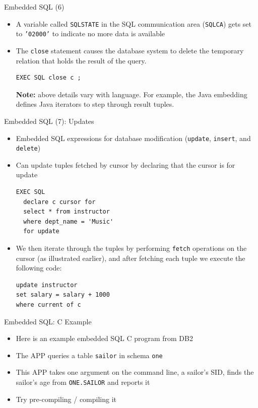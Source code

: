 \documentclass[aspectratio=169, xcolor=dvipsnames]{beamer}
\begin{document}
\begin{frame}[fragile]{Embedded SQL (6)}
    \begin{itemize}
        \item A variable called \texttt{SQLSTATE} in the SQL communication area (\texttt{SQLCA}) gets set to \texttt{'02000'} to indicate no more data is available
        \item The \texttt{close} statement causes the database system to delete the temporary relation that holds the result of the query.
        \begin{verbatim}
EXEC SQL close c ;
        \end{verbatim}
        \textbf{Note:} above details vary with language. For example, the Java embedding defines Java iterators to step through result tuples.
    \end{itemize}
\end{frame}

\begin{frame}[fragile]{Embedded SQL (7): Updates}
    \begin{itemize}
        \item Embedded SQL expressions for database modification (\texttt{update}, \texttt{insert}, and \texttt{delete})
        \item Can update tuples fetched by cursor by declaring that the cursor is for update
        \begin{verbatim}
EXEC SQL
  declare c cursor for
  select * from instructor
  where dept_name = 'Music'
  for update
        \end{verbatim}
        \item We then iterate through the tuples by performing \texttt{fetch} operations on the cursor (as illustrated earlier), and after fetching each tuple we execute the following code:
        \begin{verbatim}
update instructor
set salary = salary + 1000
where current of c
        \end{verbatim}
    \end{itemize}
\end{frame}

\begin{frame}{Embedded SQL: C Example}
    \begin{itemize}[<+->]
        \item Here is an example embedded SQL C program from DB2
        \item The APP queries a table \texttt{sailor} in schema \texttt{one}
        \item This APP takes one argument on the command line, a sailor's SID, finds the sailor's age from \texttt{ONE.SAILOR} and reports it
        \item Try pre-compiling / compiling it
    \end{itemize}
\end{frame}
\end{document}
